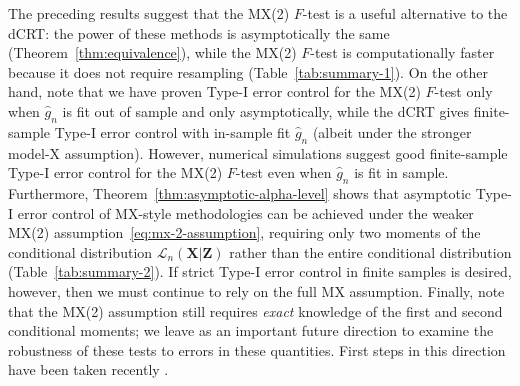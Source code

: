 \documentclass[12pt]{article}
\theoremstyle{definition}
\theoremstyle{remark}
\newcommand{\prx}{\bm X}
\newcommand{\prz}{\bm Z}
\newcommand{\pry}{{\bm Y}}
\begin{document}
The preceding results suggest that the MX(2) $F$-test is a useful alternative to the dCRT: the power of these methods is asymptotically the same (Theorem~\ref{thm:equivalence}), while the MX(2) $F$-test is computationally faster because it does not require resampling (Table~\ref{tab:summary-1}). On the other hand, note that we have proven Type-I error control for the MX(2) $F$-test only when $\widehat g_n$ is fit out of sample and only asymptotically, while the dCRT gives finite-sample Type-I error control with in-sample fit $\widehat g_n$ (albeit under the stronger model-X assumption). However, numerical simulations suggest good finite-sample Type-I error control for the MX(2) $F$-test even when $\widehat g_n$ is fit in sample. Furthermore, Theorem~\ref{thm:asymptotic-alpha-level} shows that asymptotic Type-I error control of MX-style methodologies can be achieved under the weaker MX(2) assumption~\eqref{eq:mx-2-assumption}, requiring only two moments of the conditional distribution $\mathcal L_n(\prx|\prz)$ rather than the entire conditional distribution (Table~\ref{tab:summary-2}). If strict Type-I error control in finite samples is desired, however, then we must continue to rely on the full MX assumption. %
Finally, note that the MX(2) assumption still requires \textit{exact} knowledge of the first and second conditional moments; we leave as an important future direction to examine the robustness of these tests to errors in these quantities. First steps in this direction have been taken recently \cite{Berrett2019, Li2022a}.



\end{document}

